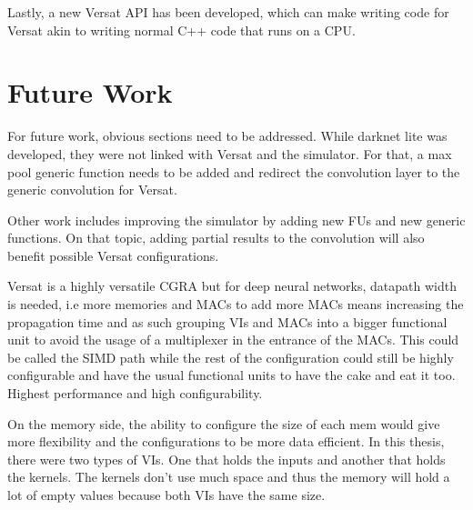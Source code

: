 Lastly, a new Versat API has been developed, which can make writing code for
Versat akin to writing normal C++ code that runs on a CPU.


\section{Future Work}
\label{section:future}

For future work, obvious sections need to be addressed. While darknet lite was developed,
they were not linked with Versat and the simulator. For that, a max pool generic function
needs to be added and redirect the convolution layer to the generic convolution for Versat.

Other work includes improving the simulator by adding new FUs and new generic functions. On that
topic, adding partial results to the convolution will also benefit possible Versat configurations.

Versat is a highly versatile CGRA but for deep neural networks, datapath width is needed, i.e
more memories and MACs to add more MACs means increasing the propagation time and as such
grouping VIs and MACs into a bigger functional unit to avoid the usage of a multiplexer
in the entrance of the MACs. This could be called the SIMD path while the rest of the configuration
could still be highly configurable and have the usual functional units to have the cake and eat it too.
Highest performance and high configurability.

On the memory side, the ability to configure the size of each mem would give more flexibility
and the configurations to be more data efficient. In this thesis, there were two types of VIs. One
that holds the inputs and another that holds the kernels. The kernels don't use much space and thus
the memory will hold a lot of empty values because both VIs have the same size.


